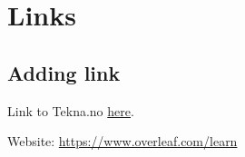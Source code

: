 \chapter{Links}

\section{Adding link}

Link to Tekna.no \href{https://www.tekna.no}{here}. 

Website: \href{https://www.overleaf.com/learn}{https://www.overleaf.com/learn}